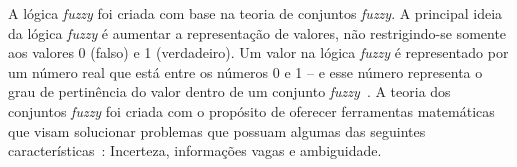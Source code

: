 \documentclass[12pt]{article}
\begin{document}
A lógica \textit{fuzzy} foi criada com base na teoria de conjuntos \textit{fuzzy}. A principal ideia da lógica \textit{fuzzy} é aumentar a representação de valores, não restrigindo-se somente aos valores 0 (falso) e 1 (verdadeiro). Um valor na lógica \textit{fuzzy} é representado por um número real que está entre os números 0 e 1 -- e esse número representa o grau de pertinência do valor dentro de um conjunto \textit{fuzzy}~\cite{boclin:06}. A teoria dos conjuntos \textit{fuzzy} foi criada com o propósito de oferecer ferramentas matemáticas que visam solucionar problemas que possuam algumas das seguintes características~\cite{falcao:02}: Incerteza, informações vagas e ambiguidade.

\end{document}
